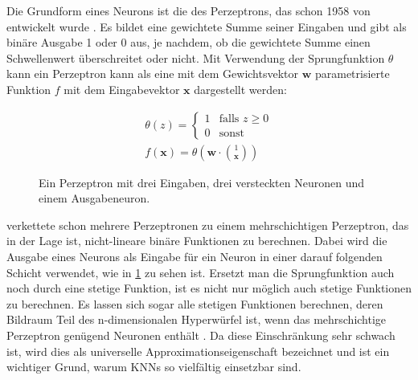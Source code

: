 Die Grundform eines Neurons ist die des Perzeptrons, das schon 1958 von  entwickelt wurde \cite{Rosenblatt1958}.
Es bildet eine gewichtete Summe seiner Eingaben und gibt als binäre Ausgabe 1 oder 0 aus, je nachdem, ob die gewichtete Summe einen Schwellenwert überschreitet oder nicht.
Mit Verwendung der Sprungfunktion $\theta$ kann ein Perzeptron kann als eine mit dem Gewichtsvektor $\mathbf{w}$ parametrisierte Funktion $f$ mit dem Eingabevektor $\mathbf{x}$ dargestellt werden:

$$
\begin{aligned}
    \theta (z) = \begin{cases} 1 & \text{falls } z \geq 0 \\ 0 & \text{sonst} \end{cases}
\\
f(\mathbf{x}) = \theta \left(\mathbf{w} \cdot \binom{1}{\mathbf{x}} \right)
\end{aligned}
$$

\begin{figure}
    \centering
    \caption{Ein Perzeptron mit drei Eingaben, drei versteckten Neuronen und einem Ausgabeneuron.}
    \label{fig:perzeptron}
\end{figure}

 verkettete schon mehrere Perzeptronen zu einem mehrschichtigen Perzeptron, das in der Lage ist, nicht-lineare binäre Funktionen zu berechnen.
Dabei wird die Ausgabe eines Neurons als Eingabe für ein Neuron in einer darauf folgenden Schicht verwendet, wie in \ref{fig:perzeptron} zu sehen ist.
Ersetzt man die Sprungfunktion auch noch durch eine stetige Funktion, ist es nicht nur möglich auch stetige Funktionen zu berechnen.
Es lassen sich sogar alle stetigen Funktionen berechnen, deren Bildraum Teil des n-dimensionalen Hyperwürfel ist, wenn das mehrschichtige Perzeptron genügend Neuronen enthält \cite{Amari1967, Cybenko1989}.
Da diese Einschränkung sehr schwach ist, wird dies als universelle Approximationseigenschaft bezeichnet und ist ein wichtiger Grund, warum KNNs so vielfältig einsetzbar sind.

